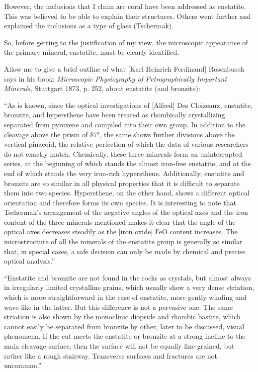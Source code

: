 \documentclass[a4paper, 12pt, oneside]{article}
\begin{document}
However, the inclusions that I claim are coral have been addressed as enstatite. This was believed to be able to explain their structures. Others went further and explained the inclusions as a type of glass (Tschermak).

So, before getting to the justification of my view, the microscopic appearance of the primary mineral, enstatite, must be clearly identified.

Allow me to give a brief outline of what [Karl Heinrich Ferdinand] Rosenbusch says in his book: \emph{Microscopic Physiography of Petrographically Important Minerals}, Stuttgart 1873, p. 252, about enstatite (and bronzite):

``As is known, since the optical investigations of [Alfred] Des Cloizeaux, enstatite, bronzite, and hypersthene have been treated as rhombically crystallizing separated from pyroxene and compiled into their own group. In addition to the cleavage above the prism of 87°, the same shows further divisions above the vertical pinacoid, the relative perfection of which the data of various researchers do not exactly match. Chemically, these three minerals form an uninterrupted series, at the beginning of which stands the almost iron-free enstatite, and at the end of which stands the very iron-rich hypersthene. Additionally, enstatite and bronzite are so similar in all physical properties that it is difficult to separate them into two species. Hypersthene, on the other hand, shows a different optical orientation and therefore forms its own species. It is interesting to note that Tschermak's arrangement of the negative angles of the optical axes and the iron content of the three minerals mentioned makes it clear that the angle of the optical axes decreases steadily as the [iron oxide] FeO content increases. The microstructure of all the minerals of the enstatite group is generally so similar that, in special cases, a safe decision can only be made by chemical and precise optical analysis.''

``Enstatite and bronzite are not found in the rocks as crystals, but almost always in irregularly limited crystalline grains, which usually show a very dense striation, which is more straightforward in the case of enstatite, more gently winding and wave-like in the latter. But this difference is not a pervasive one. The same striation is also shown by the monoclinic diopside and rhombic bastite, which cannot easily be separated from bronzite by other, later to be discussed, visual phenomena. If the cut meets the enstatite or bronzite at a strong incline to the main cleavage surface, then the surface will not be equally fine-grained, but rather like a rough stairway. Transverse surfaces and fractures are not uncommon.''
\end{document}
